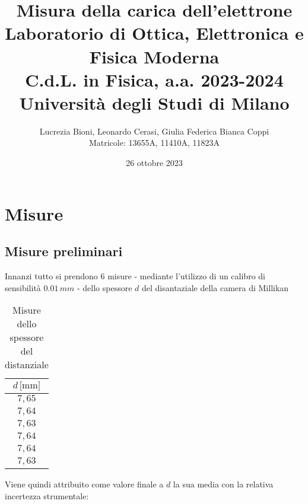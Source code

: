 \documentclass[]{article}
\title{%
    \Huge Misura della carica dell'elettrone \\
    \Large Laboratorio di Ottica, Elettronica e Fisica Moderna \\ C.d.L. in Fisica, a.a. 2023-2024 \\ Università degli Studi di Milano}
\author{\LARGE Lucrezia Bioni, Leonardo Cerasi, Giulia Federica Bianca Coppi \\ Matricole: 13655A, 11410A, 11823A}
\date{26 ottobre 2023}
\let\oldsection\section%
\renewcommand{\section}{%
	\renewcommand{\theequation}{\thesection.\arabic{equation}}%
	\oldsection}%
\let\oldsubsection\subsection%
\renewcommand{\subsection}{%
	\renewcommand{\theequation}{\thesubsection.\arabic{equation}}%
	\oldsubsection}%
\begin{document}
    \maketitle

    \section{Misure}

    \subsection{Misure preliminari}
    \label{par:misure-preliminari}

    Innanzi tutto si prendono 6 misure - mediante l'utilizzo di un calibro di sensibilità $ 0.01\, mm $ - dello spessore $ d $ del disantaziale della camera di Millikan

    \begin{table}[H]
        \centering
    
        \begin{tabular}{||c||}
            \hline
            $d\, \text{[mm]} $ \\
            \hline\hline
    
            $ 7,65 $ \\\hline
            $ 7,64 $ \\\hline
            $ 7,63 $ \\\hline
            $ 7,64 $ \\\hline
            $ 7,64 $ \\\hline
            $ 7,63 $ \\\hline

        
        \end{tabular}
        \caption{Misure dello spessore del distanziale}
        \label{distanziale}
    \end{table}

    Viene quindi attribuito come valore finale a $ d $ la sua media con la relativa incertezza strumentale:
\end{document}
